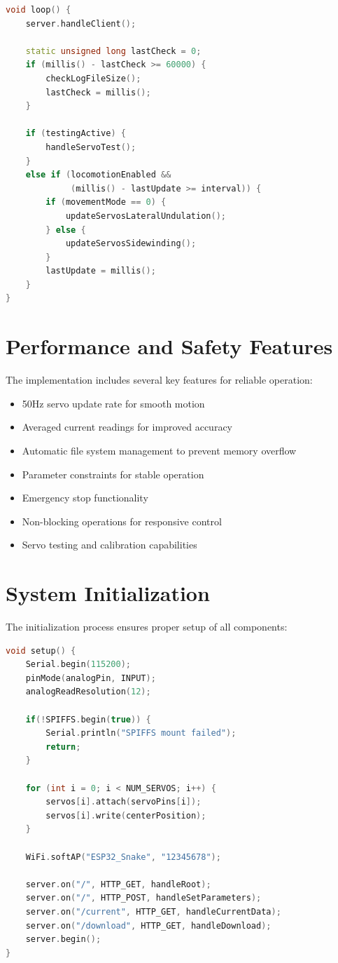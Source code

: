 \documentclass[12pt,a4paper]{report}
\begin{document}
\begin{lstlisting}[language=C++]
void loop() {
    server.handleClient();
    
    static unsigned long lastCheck = 0;
    if (millis() - lastCheck >= 60000) {
        checkLogFileSize();
        lastCheck = millis();
    }
    
    if (testingActive) {
        handleServoTest();
    }
    else if (locomotionEnabled && 
             (millis() - lastUpdate >= interval)) {
        if (movementMode == 0) {
            updateServosLateralUndulation();
        } else {
            updateServosSidewinding();
        }
        lastUpdate = millis();
    }
}
\end{lstlisting}

\section{Performance and Safety Features}
The implementation includes several key features for reliable operation:

\begin{itemize}
    \item 50Hz servo update rate for smooth motion
    \item Averaged current readings for improved accuracy
    \item Automatic file system management to prevent memory overflow
    \item Parameter constraints for stable operation
    \item Emergency stop functionality
    \item Non-blocking operations for responsive control
    \item Servo testing and calibration capabilities
\end{itemize}

\section{System Initialization}
The initialization process ensures proper setup of all components:

\begin{lstlisting}[language=C++]
void setup() {
    Serial.begin(115200);
    pinMode(analogPin, INPUT);
    analogReadResolution(12);
    
    if(!SPIFFS.begin(true)) {
        Serial.println("SPIFFS mount failed");
        return;
    }
    
    for (int i = 0; i < NUM_SERVOS; i++) {
        servos[i].attach(servoPins[i]);
        servos[i].write(centerPosition);
    }
    
    WiFi.softAP("ESP32_Snake", "12345678");
    
    server.on("/", HTTP_GET, handleRoot);
    server.on("/", HTTP_POST, handleSetParameters);
    server.on("/current", HTTP_GET, handleCurrentData);
    server.on("/download", HTTP_GET, handleDownload);
    server.begin();
}
\end{lstlisting}
\end{document}
